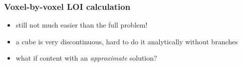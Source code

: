 \documentclass{beamer}
\begin{document}
\begin{frame}
  \frametitle{Voxel-by-voxel LOI calculation}
  \begin{itemize}
  \item still not much easier than the full problem!
  \item a cube is very discontinuous, hard to do it analytically without branches
    \pause
  \item what if content with an \textsl{approximate} solution?
  \end{itemize}

  \begin{figure}
    \centering

\end{figure}
\end{frame}
\end{document}
